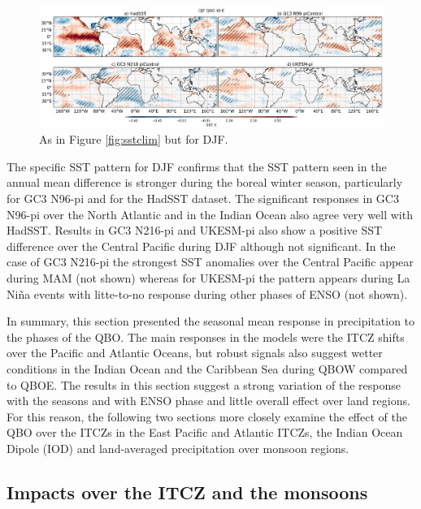 \begin{figure}[t!]
\centering
 \includegraphics[width=\linewidth]{figures/pisstdjfqbowqboe.png}
\caption[DJF mean SST difference QBO W-E under different QBO phases.]{ As in Figure \ref{fig:sstclim} but for DJF.}
\label{fig:djfclim}
\end{figure}

The specific SST pattern for DJF confirms that the SST pattern seen in the annual mean difference is stronger during the boreal winter season, particularly for GC3 N96-pi and for the HadSST dataset. The significant responses in GC3 N96-pi over the North Atlantic and in the Indian Ocean also agree very well with HadSST. Results in GC3 N216-pi and UKESM-pi also show a positive SST difference over the Central Pacific during DJF although not significant. 
In the case of GC3 N216-pi the strongest SST anomalies over the Central Pacific appear during MAM (not shown) whereas for UKESM-pi the pattern appears during La Niña events with litte-to-no response during other phases of ENSO (not shown).  

In summary, this section presented the seasonal mean response in precipitation to the phases of the QBO. The main responses in the models were the ITCZ shifts over the Pacific and Atlantic Oceans, but robust signals also suggest wetter conditions in the Indian Ocean and the Caribbean Sea during QBOW compared to QBOE. The results in this section suggest a strong variation of the response with the seasons and with ENSO phase and little overall effect over land regions.
For this reason, the following two sections more closely examine the effect of the QBO over the ITCZs in the East Pacific and Atlantic ITCZs, the Indian Ocean Dipole (IOD) and land-averaged precipitation over monsoon regions. 

\subsection{Impacts over the ITCZ and the monsoons}

